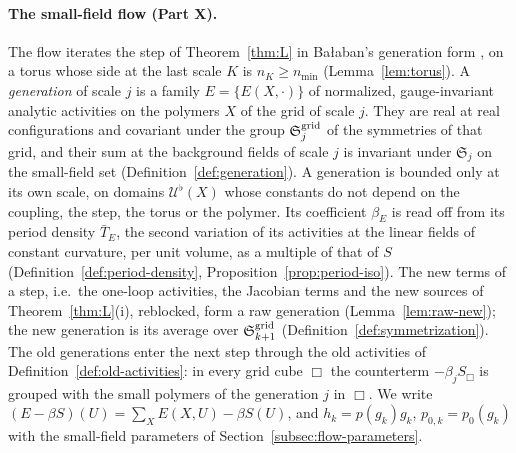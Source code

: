 \paragraph{The small-field flow (Part X).} The flow iterates the step of Theorem~\ref{thm:L} in Ba\l aban's generation form \cite[(0.22)--(0.30)]{BalYM4I}, on a torus whose side at the last scale $K$ is $n_K\ge n_{\min}$ (Lemma~\ref{lem:torus}). A \emph{generation} of scale $j$ is a family $E=\{E(X,\cdot)\}$ of normalized, gauge-invariant analytic activities on the polymers $X$ of the grid of scale $j$. They are real at real configurations and covariant under the group $\mathfrak S^{\rm grid}_j$ of the symmetries of that grid, and their sum at the background fields of scale $j$ is invariant under $\mathfrak S_j$ on the small-field set (Definition~\ref{def:generation}). A generation is bounded only at its own scale, on domains $\mathcal U^\flat(X)$ whose constants do not depend on the coupling, the step, the torus or the polymer. Its coefficient $\beta_E$ is read off from its period density $\bar T_E$, the second variation of its activities at the linear fields of constant curvature, per unit volume, as a multiple of that of $S$ (Definition~\ref{def:period-density}, Proposition~\ref{prop:period-iso}). The new terms of a step, i.e.\ the one-loop activities, the Jacobian terms and the new sources of Theorem~\ref{thm:L}(i), reblocked, form a raw generation (Lemma~\ref{lem:raw-new}); the new generation is its average over $\mathfrak S^{\rm grid}_{k+1}$ (Definition~\ref{def:symmetrization}). The old generations enter the next step through the old activities of Definition~\ref{def:old-activities}: in every grid cube $\Box$ the counterterm $-\beta_jS_\Box$ is grouped with the small polymers of the generation $j$ in $\Box$. We write $(E-\beta S)(U)=\sum_XE(X,U)-\beta S(U)$, and $h_k=p(g_k)g_k$, $p_{0,k}=p_0(g_k)$ with the small-field parameters of Section~\ref{subsec:flow-parameters}.

